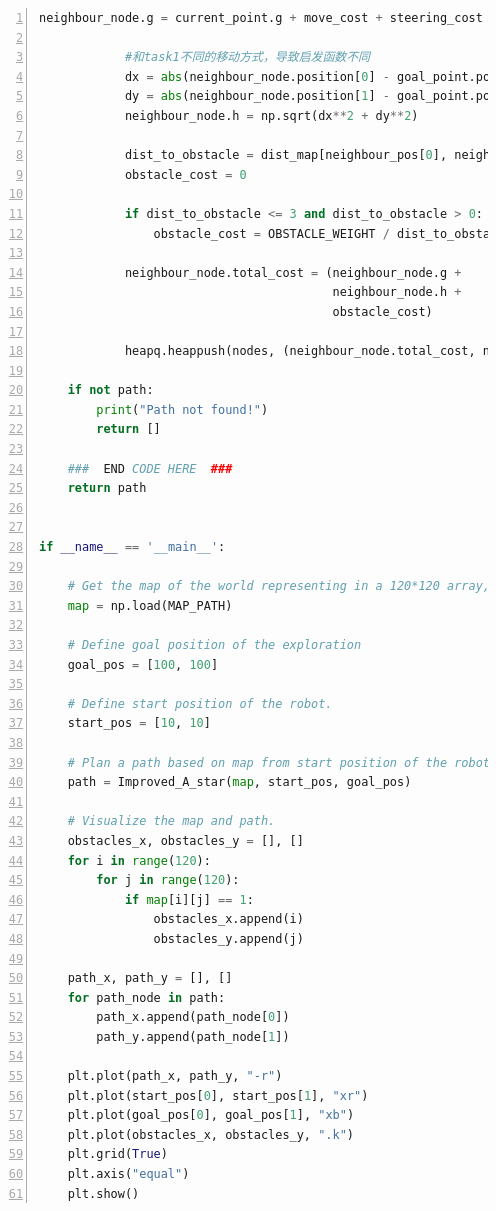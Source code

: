 \documentclass[aps,letterpaper,10pt]{revtex4}
\begin{document}
\begin{lstlisting}[language=Python, caption={Source Code for Task 1 (5-Task\_1.py)}, label={lst:task1_code}, basicstyle=\ttfamily\small, numbers=left, frame=tb, breaklines=true]
            neighbour_node.g = current_point.g + move_cost + steering_cost

            #和task1不同的移动方式，导致启发函数不同
            dx = abs(neighbour_node.position[0] - goal_point.position[0])
            dy = abs(neighbour_node.position[1] - goal_point.position[1])
            neighbour_node.h = np.sqrt(dx**2 + dy**2)
            
            dist_to_obstacle = dist_map[neighbour_pos[0], neighbour_pos[1]]
            obstacle_cost = 0

            if dist_to_obstacle <= 3 and dist_to_obstacle > 0:
                obstacle_cost = OBSTACLE_WEIGHT / dist_to_obstacle

            neighbour_node.total_cost = (neighbour_node.g + 
                                         neighbour_node.h + 
                                         obstacle_cost)
            
            heapq.heappush(nodes, (neighbour_node.total_cost, neighbour_node))

    if not path:
        print("Path not found!")
        return []

    ###  END CODE HERE  ###
    return path


if __name__ == '__main__':

    # Get the map of the world representing in a 120*120 array, where 0 indicating traversable and 1 indicating obstacles.
    map = np.load(MAP_PATH)

    # Define goal position of the exploration
    goal_pos = [100, 100]

    # Define start position of the robot.
    start_pos = [10, 10]

    # Plan a path based on map from start position of the robot to the goal.
    path = Improved_A_star(map, start_pos, goal_pos)

    # Visualize the map and path.
    obstacles_x, obstacles_y = [], []
    for i in range(120):
        for j in range(120):
            if map[i][j] == 1:
                obstacles_x.append(i)
                obstacles_y.append(j)

    path_x, path_y = [], []
    for path_node in path:
        path_x.append(path_node[0])
        path_y.append(path_node[1])

    plt.plot(path_x, path_y, "-r")
    plt.plot(start_pos[0], start_pos[1], "xr")
    plt.plot(goal_pos[0], goal_pos[1], "xb")
    plt.plot(obstacles_x, obstacles_y, ".k")
    plt.grid(True)
    plt.axis("equal")
    plt.show()
\end{lstlisting}
\end{document}

